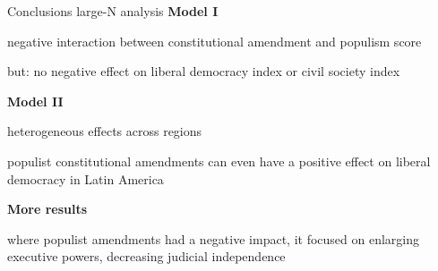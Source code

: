 \documentclass[xcolor=dvipsnames,aspectratio=169,12pt]{beamer}
\begin{document}
\begin{frame}{Conclusions large-N analysis}
\textbf{Model I}    
\begin{wideitemize}
    \item negative interaction between constitutional amendment and populism score
    \item but: no negative effect on liberal democracy index or civil society index
\end{wideitemize} 
\textbf{Model II}
\begin{wideitemize}
    \item heterogeneous effects across regions
    \item populist constitutional amendments can even have a positive effect on liberal democracy in Latin America
\end{wideitemize} 
\textbf{More results}
\begin{wideitemize}
    \item where populist amendments had a negative impact, it focused on enlarging executive powers, decreasing judicial independence
\end{wideitemize} 
\end{frame}



\end{document}
